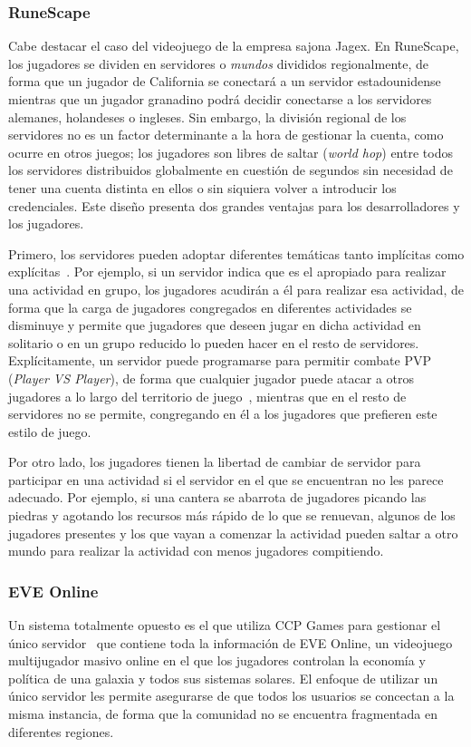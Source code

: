 \documentclass[runningheads]{llncs}
\begin{document}
\subsubsection{RuneScape}
Cabe destacar el caso del videojuego de la empresa sajona Jagex.
En RuneScape, los jugadores se dividen en servidores o \textit{mundos} divididos regionalmente, de forma que un jugador de California se conectará a un servidor estadounidense mientras que un jugador granadino podrá decidir conectarse a los servidores alemanes, holandeses o ingleses.
Sin embargo, la división regional de los servidores no es un factor determinante a la hora de gestionar la cuenta, como ocurre en otros juegos; los jugadores son libres de saltar (\textit{world hop}) entre todos los servidores distribuidos globalmente en cuestión de segundos sin necesidad de tener una cuenta distinta en ellos o sin siquiera volver a introducir los credenciales.
Este diseño presenta dos grandes ventajas para los desarrolladores y los jugadores.

Primero, los servidores pueden adoptar diferentes temáticas tanto implícitas como explícitas~\cite{osrs_servidores}.
Por ejemplo, si un servidor indica que es el apropiado para realizar una actividad en grupo, los jugadores acudirán a él para realizar esa actividad, de forma que la carga de jugadores congregados en diferentes actividades se disminuye y permite que jugadores que deseen jugar en dicha actividad en solitario o en un grupo reducido lo pueden hacer en el resto de servidores.
Explícitamente, un servidor puede programarse para permitir combate PVP (\textit{Player VS Player}), de forma que cualquier jugador puede atacar a otros jugadores a lo largo del territorio de juego~\cite{osrs_bh}, mientras que en el resto de servidores no se permite, congregando en él a los jugadores que prefieren este estilo de juego.

Por otro lado, los jugadores tienen la libertad de cambiar de servidor para participar en una actividad si el servidor en el que se encuentran no les parece adecuado.
Por ejemplo, si una cantera se abarrota de jugadores picando las piedras y agotando los recursos más rápido de lo que se renuevan, algunos de los jugadores presentes y los que vayan a comenzar la actividad pueden saltar a otro mundo para realizar la actividad con menos jugadores compitiendo.

\subsubsection{EVE Online}
Un sistema totalmente opuesto es el que utiliza CCP Games para gestionar el único servidor~\cite{eve_shard} que contiene toda la información de EVE Online, un videojuego multijugador masivo online en el que los jugadores controlan la economía y política de una galaxia y todos sus sistemas solares.
El enfoque de utilizar un único servidor les permite asegurarse de que todos los usuarios se concectan a la misma instancia, de forma que la comunidad no se encuentra fragmentada en diferentes regiones.
\end{document}
